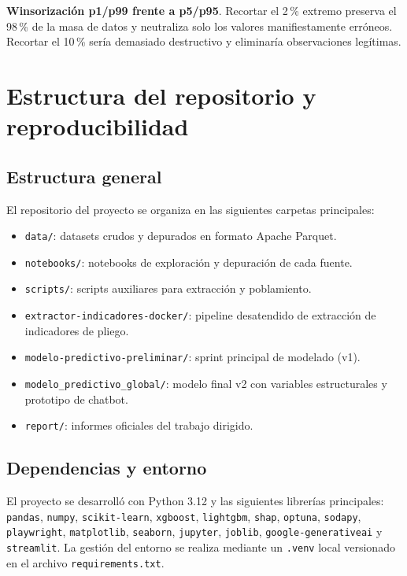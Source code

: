 \documentclass[12pt,letterpaper,oneside]{report}
\begin{document}
\textbf{Winsorización p1/p99 frente a p5/p95}. Recortar el 2\,\% extremo
preserva el 98\,\% de la masa de datos y neutraliza solo los valores
manifiestamente erróneos. Recortar el 10\,\% sería demasiado destructivo y
eliminaría observaciones legítimas.

\chapter{Estructura del repositorio y reproducibilidad}
\label{anexo:repositorio}

\section{Estructura general}

El repositorio del proyecto se organiza en las siguientes carpetas
principales:

\begin{itemize}
    \item \texttt{data/}: datasets crudos y depurados en formato Apache Parquet.
    \item \texttt{notebooks/}: notebooks de exploración y depuración de cada
    fuente.
    \item \texttt{scripts/}: scripts auxiliares para extracción y poblamiento.
    \item \texttt{extractor-indicadores-docker/}: pipeline desatendido de
    extracción de indicadores de pliego.
    \item \texttt{modelo-predictivo-preliminar/}: sprint principal de modelado
    (v1).
    \item \texttt{modelo\_predictivo\_global/}: modelo final v2 con variables
    estructurales y prototipo de chatbot.
    \item \texttt{report/}: informes oficiales del trabajo dirigido.
\end{itemize}

\section{Dependencias y entorno}

El proyecto se desarrolló con Python 3.12 y las siguientes librerías
principales: \texttt{pandas}, \texttt{numpy}, \texttt{scikit-learn},
\texttt{xgboost}, \texttt{lightgbm}, \texttt{shap}, \texttt{optuna},
\texttt{sodapy}, \texttt{playwright}, \texttt{matplotlib}, \texttt{seaborn},
\texttt{jupyter}, \texttt{joblib}, \texttt{google-generativeai} y
\texttt{streamlit}. La gestión del entorno se realiza mediante un
\texttt{.venv} local versionado en el archivo \texttt{requirements.txt}.
\end{document}
